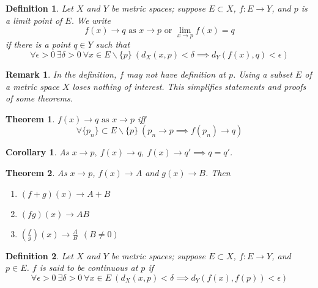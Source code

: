\documentclass[aps,pra,onecolumn,notitlepage,superscriptaddress]{revtex4-1}
\newtheorem{theo}{Theorem}
\newtheorem{cor}{Corollary}
\newtheorem{defi}{Definition}
\newtheorem{rem}{Remark}
\begin{document}
    \begin{defi}
        Let $X$ and $Y$ be metric spaces; suppose $E \subset X$, $f: E \to Y$, and $p$ is a limit point of $E$. We write 
        \begin{equation}
            f(x) \to q \text{ as } x \to p \text{ or } \lim_{x \to p} f(x) = q
        \end{equation}
        if there is a point $q \in Y$ such that
        \begin{equation}
            \forall \epsilon > 0 \ \exists \delta > 0 \ \forall x \in E \backslash \{p\} \ \left( d_X(x,p) < \delta \implies d_Y(f(x),q) < \epsilon \right)
        \end{equation}
    \end{defi}

    \begin{rem}
        In the definition, $f$ may not have definition at $p$. Using a subset $E$ of a metric space $X$ loses nothing of interest. This simplifies statements and proofs of some theorems.
    \end{rem}

    \begin{theo}
        $f(x) \to q \text{ as } x \to p$ iff
        \begin{equation}
            \forall \{p_n\} \subset E \backslash \{p\} \ (p_n \to p \implies f(p_n) \to q)
        \end{equation}
    \end{theo}

    \begin{cor}
        As $x \to p,\ f(x) \to q,\ f(x) \to q' \implies q = q'$.
    \end{cor}

    \begin{theo}
        As $x \to p$, $f(x) \to A$ and $g(x) \to B$. Then
        \begin{enumerate}
            \item $(f+g)(x) \to A+B$
            \item $(fg)(x) \to AB$
            \item $(\frac{f}{g})(x) \to \frac{A}{B} \ \ (B \neq 0)$
        \end{enumerate}
    \end{theo}
    
    \begin{defi}
        Let $X$ and $Y$ be metric spaces; suppose $E \subset X$, $f: E \to Y$, and $p \in E$. $f$ is said to be continuous at $p$ if
        \begin{equation}
            \forall \epsilon > 0 \ \exists \delta > 0 \ \forall x \in E \ \left( d_X(x,p) < \delta \implies d_Y(f(x),f(p)) < \epsilon \right)
        \end{equation}
    \end{defi}
\end{document}
